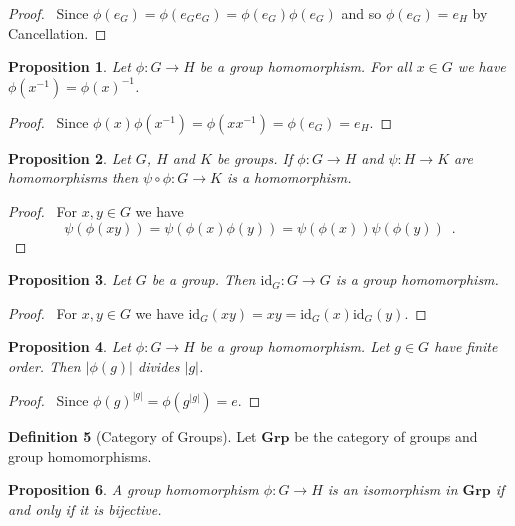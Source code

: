 \documentclass{book}
\let\qed\relax
\newtheorem{prop}{Proposition}[chapter]
\theoremstyle{definition}
\newtheorem{df}[prop]{Definition}
\newcommand{\id}[1]{\ensuremath{\mathrm{id}_{#1}}}
\begin{document}
\begin{proof}
    \pf\ Since $\phi(e_G) = \phi(e_G e_G) = \phi(e_G) \phi(e_G)$ and so $\phi(e_G) = e_H$ by Cancellation. \qed
\end{proof}

\begin{prop}
    Let $\phi : G \rightarrow H$ be a group homomorphism. For all $x \in G$ we have $\phi(x^{-1}) = \phi(x)^{-1}$.
\end{prop}

\begin{proof}
    \pf\ Since $\phi(x) \phi(x^{-1}) = \phi(xx^{-1}) = \phi(e_G) = e_H$. \qed
\end{proof}

\begin{prop}
    Let $G$, $H$ and $K$ be groups. If $\phi : G \rightarrow H$ and $\psi : H \rightarrow K$ are homomorphisms then $\psi \circ \phi : G \rightarrow K$ is a homomorphism.
\end{prop}

\begin{proof}
    \pf\ For $x,y \in G$ we have
    \[ \psi(\phi(xy)) = \psi(\phi(x) \phi(y)) = \psi(\phi(x)) \psi(\phi(y)) \enspace . \]
\end{proof}

\begin{prop}
    Let $G$ be a group. Then $\id{G} : G \rightarrow G$ is a group homomorphism.
\end{prop}

\begin{proof}
    \pf\ For $x,y \in G$ we have $\id{G}(xy) = xy = \id{G}(x) \id{G}(y)$. \qed
\end{proof}

\begin{prop}
    Let $\phi : G \rightarrow H$ be a group homomorphism. Let $g \in G$ have finite order. Then $|\phi(g)|$ divides $|g|$.
\end{prop}

\begin{proof}
    \pf\ Since $\phi(g)^{|g|} = \phi(g^{|g|}) = e$. \qed
\end{proof}

\begin{df}[Category of Groups]
    Let $\mathbf{Grp}$ be the category of groups and group homomorphisms.
\end{df}

\begin{prop}
    A group homomorphism $\phi : G \rightarrow H$ is an isomorphism in $\mathbf{Grp}$ if and only if it is bijective.
\end{prop}
\end{document}
